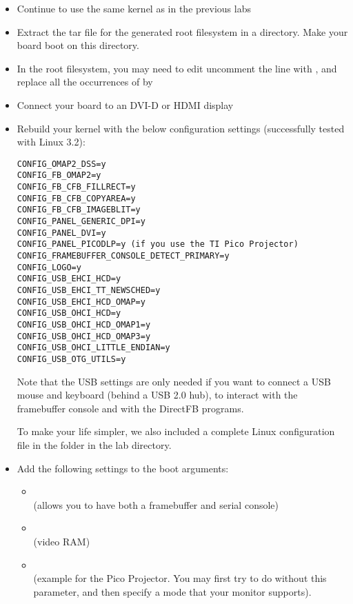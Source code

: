 \begin{itemize}
\item Continue to use the same kernel as in the previous labs
\item Extract the tar file for the generated root filesystem in a
 directory. Make your board boot on this directory. 
\item In the root filesystem, you may need to edit 
  uncomment the line with , and replace all the occurrences
  of  by 
\item Connect your board to an DVI-D or HDMI display
\item Rebuild your kernel with the below configuration settings
(successfully tested with Linux 3.2):
\begin{verbatim}
CONFIG_OMAP2_DSS=y
CONFIG_FB_OMAP2=y
CONFIG_FB_CFB_FILLRECT=y
CONFIG_FB_CFB_COPYAREA=y
CONFIG_FB_CFB_IMAGEBLIT=y
CONFIG_PANEL_GENERIC_DPI=y
CONFIG_PANEL_DVI=y
CONFIG_PANEL_PICODLP=y (if you use the TI Pico Projector)
CONFIG_FRAMEBUFFER_CONSOLE_DETECT_PRIMARY=y
CONFIG_LOGO=y
CONFIG_USB_EHCI_HCD=y
CONFIG_USB_EHCI_TT_NEWSCHED=y
CONFIG_USB_EHCI_HCD_OMAP=y
CONFIG_USB_OHCI_HCD=y
CONFIG_USB_OHCI_HCD_OMAP1=y
CONFIG_USB_OHCI_HCD_OMAP3=y
CONFIG_USB_OHCI_LITTLE_ENDIAN=y
CONFIG_USB_OTG_UTILS=y
\end{verbatim}

Note that the USB settings are only needed if you want to connect a USB
mouse and keyboard (behind a USB 2.0 hub), to interact with the
framebuffer console and with the DirectFB programs.

To make your life simpler, we also included a complete Linux
configuration file in the  folder in the lab directory.

\item Add the following settings to the boot arguments:
  \begin{itemize}
  \item {}\\(allows you to have both a framebuffer
    and serial console)
  \item {}\\(video RAM)
  \item {}\\(example for the
    Pico Projector. You may first try to do without this parameter,
    and then specify a mode that your monitor supports).
  \end{itemize}
\end{itemize}

